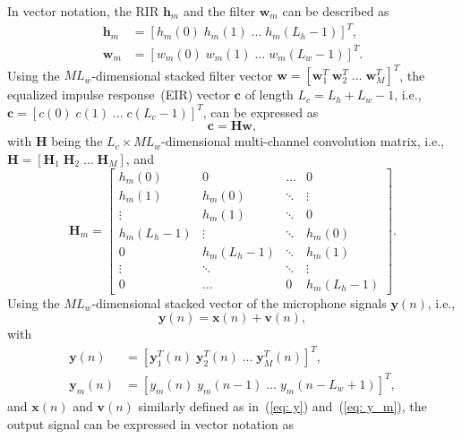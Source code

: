 \documentclass[10pt]{IEEEtran}
\begin{document}
In vector notation, the RIR $\mathbf{h}_m$ and the filter $\mathbf{w}_m$ can be described as 
\begin{align}
\mathbf{h}_m  & = [h_m(0) \; h_m(1) \; \ldots \; h_m(L_h-1)]^T, \\
\mathbf{w}_m  & = [w_m(0) \; w_m(1) \; \ldots \; w_m(L_w-1)]^T.
\end{align}
Using the $M L_w$-dimensional stacked filter vector $\mathbf{w} = [\mathbf{w}^T_1 \; \mathbf{w}^T_2 \; \ldots \; \mathbf{w}^T_M]^T$, the equalized impulse response~(EIR) vector $\mathbf{c}$ of length $L_c = L_h + L_w - 1$, i.e., $\mathbf{c} = [c(0) \; c(1) \; \ldots \; c(L_c-1)]^T$, can be expressed as
\begin{equation}
\label{eq: eir}
\mathbf{c} = \mathbf{H}\mathbf{w},
\end{equation}
with $\mathbf{H}$ being the $L_c \times ML_w$-dimensional multi-channel convolution matrix, i.e., $\mathbf{H}  = [\mathbf{H}_1 \; \mathbf{H}_2 \; \ldots \; \mathbf{H}_M]$, and
\begin{equation}
\mathbf{H}_m \! = \! \begin{bmatrix}
    h_m(0) & 0 &  \ldots & 0 \\
    h_m(1) & h_m(0) & \ddots & \vdots \\
    \vdots & h_m(1) & \ddots & 0 \\
    h_m(L_h\!-\!1) & \vdots & \ddots & h_m(0) \\
    0 & h_m(L_h\!-\!1) & \ddots & h_m(1) \\
    \vdots & \ddots & \ddots & \vdots \\
    0 & \ldots & 0 & h_m(L_h\!-\!1)
   \end{bmatrix}.
 \end{equation}
Using the $ML_w$-dimensional stacked vector of the microphone signals $\mathbf{y}(n)$, i.e.,
\begin{equation}
\mathbf{y}(n) = \mathbf{x}(n) + \mathbf{v}(n), 
\end{equation}
with
\begin{align}
  \label{eq: y}
  \mathbf{y}(n) &= [\mathbf{y}^T_1(n) \; \mathbf{y}^T_2(n) \; \ldots \; \mathbf{y}^T_M(n)]^T, \\
  \label{eq: y_m}
  \mathbf{y}_m(n) &= [y_m(n) \; y_m(n-1) \; \ldots \; y_m(n-L_w+1)]^T,
\end{align}
and $\mathbf{x}(n)$ and $\mathbf{v}(n)$ similarly defined as in~(\ref{eq: y}) and~(\ref{eq: y_m}), the output signal can be expressed in vector notation as
\end{document}
